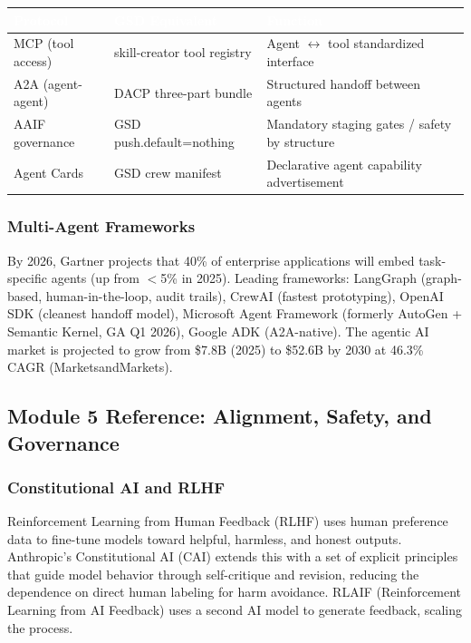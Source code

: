 \documentclass[11pt,letterpaper]{article}
\newcommand{\tableheader}[1]{\textbf{\sffamily\textcolor{white}{#1}}}
\begin{document}
\begin{center}
\begin{tabularx}{\textwidth}{L{3cm}L{3cm}X}
\toprule
{}
\tableheader{Protocol} & \tableheader{GSD Equivalent} & \tableheader{Function} \\
\midrule
MCP (tool access) & skill-creator tool registry & Agent $\leftrightarrow$ tool standardized interface \\
A2A (agent-agent) & DACP three-part bundle & Structured handoff between agents \\
AAIF governance & GSD push.default=nothing & Mandatory staging gates / safety by structure \\
Agent Cards & GSD crew manifest & Declarative agent capability advertisement \\
\bottomrule
\end{tabularx}
\end{center}

\subsubsection{Multi-Agent Frameworks}

By 2026, Gartner projects that 40\% of enterprise applications will embed task-specific agents (up from $<$5\% in 2025). Leading frameworks: LangGraph (graph-based, human-in-the-loop, audit trails), CrewAI (fastest prototyping), OpenAI SDK (cleanest handoff model), Microsoft Agent Framework (formerly AutoGen + Semantic Kernel, GA Q1 2026), Google ADK (A2A-native). The agentic AI market is projected to grow from \$7.8B (2025) to \$52.6B by 2030 at 46.3\% CAGR (MarketsandMarkets).

\subsection{Module 5 Reference: Alignment, Safety, and Governance}

\subsubsection{Constitutional AI and RLHF}

Reinforcement Learning from Human Feedback (RLHF) uses human preference data to fine-tune models toward helpful, harmless, and honest outputs. Anthropic's Constitutional AI (CAI) extends this with a set of explicit principles that guide model behavior through self-critique and revision, reducing the dependence on direct human labeling for harm avoidance. RLAIF (Reinforcement Learning from AI Feedback) uses a second AI model to generate feedback, scaling the process.
\end{document}
